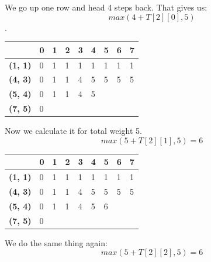 \documentclass{article}
\begin{document}
We go up one row and head 4 steps back. That gives us:
$$max(4 + T[2][0], 5)$$.
\begin{center}
\begin{tabular}{|l|l|l|l|l|l|l|l|l|}
\hline
                & \textbf{0} & \textbf{1} & \textbf{2} & \textbf{3} & \textbf{4} & \textbf{5} & \textbf{6} & \textbf{7} \\ \hline
\textbf{(1, 1)} & 0          &1            &1            &1            &1            &1            &1            &1            \\ \hline
\textbf{(4, 3)} & 0          &1            &1            &4            &5            &5            &  5          &  5          \\ \hline
\textbf{(5, 4)} & 0          &1            &1            &4            &5            &            &            &            \\ \hline
\textbf{(7, 5)} & 0          &            &            &            &            &            &            &            \\ \hline
\end{tabular}
\end{center}
Now we calculate it for total weight 5. 
$$max(5 + T[2][1], 5) = 6$$
\begin{center}
\begin{tabular}{|l|l|l|l|l|l|l|l|l|}
\hline
                & \textbf{0} & \textbf{1} & \textbf{2} & \textbf{3} & \textbf{4} & \textbf{5} & \textbf{6} & \textbf{7} \\ \hline
\textbf{(1, 1)} & 0          &1            &1            &1            &1            &1            &1            &1            \\ \hline
\textbf{(4, 3)} & 0          &1            &1            &4            &5            &5            &  5          &  5          \\ \hline
\textbf{(5, 4)} & 0          &1            &1            &4            &5            &6            &            &            \\ \hline
\textbf{(7, 5)} & 0          &            &            &            &            &            &            &            \\ \hline
\end{tabular}
\end{center}
We do the same thing again:
$$max(5 + T[2][2], 5) = 6$$
\end{document}
